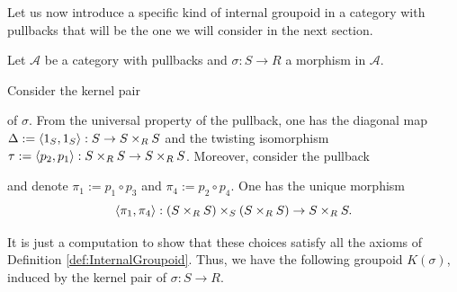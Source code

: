 Let us now introduce a specific kind of internal groupoid in a category with pullbacks that will be the one we will consider in the next section.
\begin{example}
\label{ex:KernelPairInternalGroupoid}
    Let $\mathcal{A}$ be a category with pullbacks and $\sigma:S\to R$ a morphism in $\mathcal{A}$.

    Consider the kernel pair
     of $\sigma$. From the universal property of the pullback, one has the diagonal map $\Delta:=\langle{1_S},{1_S}\rangle:S\to S\times_RS$ and the twisting isomorphism $\tau:=\langle{p_2},{p_1}\rangle:S\times_RS\to S\times_RS$. Moreover, consider the pullback
    \begin{center}
    \end{center}
    and denote $\pi_1:=p_1\circ p_3$ and $\pi_4:=p_2\circ p_4$. One has the unique morphism
    \[ \langle{\pi_1},{\pi_4}\rangle:(S\times_RS)\times_S (S\times_RS)\to S\times_RS. \]

    It is just a computation to show that these choices satisfy all the axioms of Definition \ref{def:InternalGroupoid}. Thus, we have the following groupoid $K(\sigma)$, induced by the kernel pair of $\sigma:S\to R$.
    \begin{center}
    \end{center}
\end{example}

